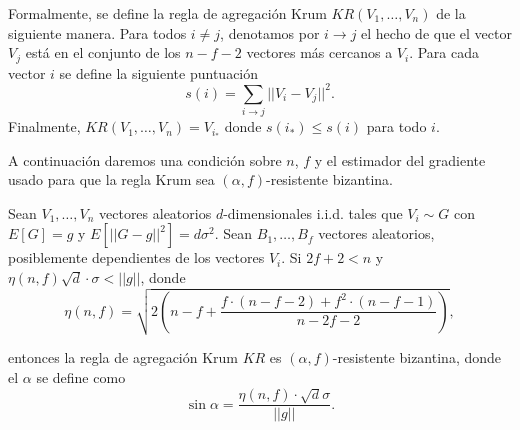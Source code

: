 Formalmente, se define la regla de agregación Krum $KR(V_1, \ldots, V_n)$ de la siguiente manera. Para todos $i \ne j$, denotamos por $i \to j$ el hecho de que el vector $V_j$ está en el conjunto de los $n-f-2$ vectores más cercanos a $V_i$. Para cada vector $i$ se define la siguiente puntuación
\begin{equation}
	s(i) = \sum_{i \to j} ||V_i - V_j||^2.
\end{equation}
Finalmente, $KR(V_1, \ldots, V_n) = V_{i_*}$ donde $s(i_*) \le s(i)$ para todo $i$.

A continuación daremos una condición sobre $n$, $f$ y el estimador del gradiente usado para que la regla Krum sea $(\alpha, f)$-resistente bizantina.

\begin{theorem}
	Sean $V_1, \ldots, V_n$ vectores aleatorios $d$-dimensionales \ac{i.i.d.} tales que $V_i \sim G$ con $E[G]=g$ y $E[||G-g||^2]=d\sigma^2$. Sean $B_1, \ldots, B_f$ vectores aleatorios, posiblemente dependientes de los vectores $V_i$. Si $2f + 2 < n$ y $\eta(n, f)\sqrt{d}\cdot \sigma < ||g||$, donde
	\begin{equation}
		\eta(n,f) = \sqrt{2 \left( n-f + \frac{f \cdot (n-f-2) + f^2 \cdot(n-f-1)}{n-2f-2} \right)},
	\end{equation}
	
	entonces la regla de agregación Krum $KR$ es $(\alpha, f)$-resistente bizantina, donde el $\alpha$ se define como
	\begin{equation}
		\sin \alpha = \frac{\eta(n, f) \cdot \sqrt{d} \sigma}{||g||}.
	\end{equation}
\end{theorem}

